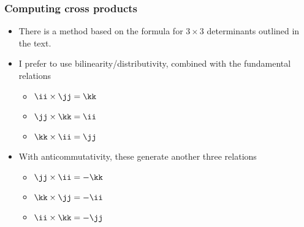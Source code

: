 \documentclass[11pt,ignorenonframetext,xcolor={svgnames},aspectratio=169]{beamer}
\begin{document}
\begin{frame}\frametitle{Computing cross products}

\begin{itemize}
\item
  There is a method based on the formula for $3 \times 3$ determinants
  outlined in the text.
\item
  I prefer to use bilinearity/distributivity, combined with the
  fundamental relations

  \begin{itemize}
  
  \item
    $\ii \times \jj = \kk$
  \item
    $\jj \times \kk = \ii$
  \item
    $\kk \times \ii = \jj$
  \end{itemize}
\end{itemize}

\begin{itemize}
\item
  With anticommutativity, these generate another three relations

  \begin{itemize}
  
  \item
    $\jj \times \ii= -\kk$
  \item
    $\kk \times \jj= -\ii$
  \item
    $\ii \times \kk= -\jj$
  \end{itemize}
\end{itemize}

\end{frame}
\end{document}
